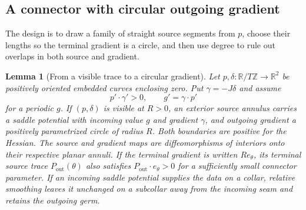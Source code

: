 \documentclass[11pt]{amsart}
\newtheorem{lemma}[theorem]{Lemma}
\theoremstyle{definition}
\theoremstyle{remark}
\newcommand{\R}{\mathbb R}\newcommand{\Sph}{\mathbb S}
\numberwithin{equation}{section}
\begin{document}
\subsection{A connector with circular outgoing gradient}
The design is to draw a family of straight source segments from $p$,
choose their lengths so the terminal gradient is a circle, and then use
degree to rule out overlaps in both source and gradient.
\begin{lemma}[From a visible trace to a circular gradient]\label{lem:connector}
Let $p,\delta:\R/T\mathbb Z\to\R^2$ be positively oriented embedded
curves enclosing zero. Put $\gamma=-J\delta$ and assume
\begin{equation}\label{eq:connector-data}
 p'\cdot\gamma'>0,\qquad g'=\gamma\cdot p'
\end{equation}
for a periodic $g$. If $(p,\delta)$ is visible at $R>0$, an exterior
source annulus carries a saddle potential with incoming value $g$ and
gradient $\gamma$, and outgoing gradient a positively parametrized
circle of radius $R$. Both boundaries are positive for the Hessian.
The source and gradient maps are diffeomorphisms of interiors onto their
respective planar annuli. If the terminal gradient is written
$Re_\theta$, its terminal source trace $P_\mathrm{out}(\theta)$ also
satisfies $P_\mathrm{out}\cdot e_\theta>0$ for a sufficiently small
connector parameter. If an incoming saddle potential supplies the data on a collar,
relative smoothing leaves it unchanged on a subcollar away from the
incoming seam and retains the outgoing germ.
\end{lemma}
\end{document}
